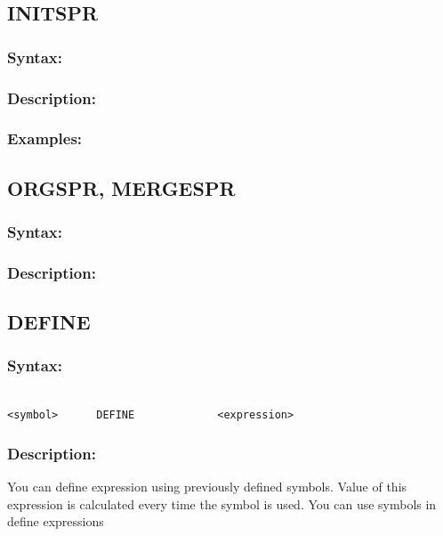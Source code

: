     \subsection{INITSPR}
        \subsubsection{Syntax:}

        \subsubsection{Description:}

        \subsubsection{Examples:}


    \subsection{ORGSPR, MERGESPR}
        \subsubsection{Syntax:}

        \subsubsection{Description:}

    \subsection{DEFINE}
        \subsubsection{Syntax:}
        {
            ~\\
            \usecodefont
            \verb'<symbol>      DEFINE             <expression>'
        }
        \subsubsection{Description:}
        You can define expression using previously defined symbols. Value of this expression is calculated every time the symbol is used. You can use symbols in define expressions

